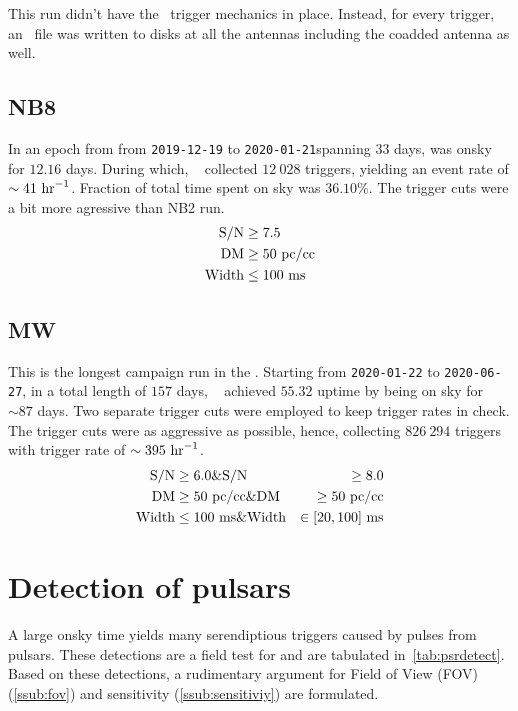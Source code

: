 \par This run didn't have the \dbson~trigger mechanics in place. Instead, for every trigger, an \fbson~file was written to disks at all the antennas including the coadded antenna as well.

\subsection {NB8}

\par In an epoch from from \texttt{2019-12-19} to \texttt{2020-01-21}spanning $33$ days, \vf was onsky for $12.16$ days.
During which, \vf~ collected $12\ 028$ triggers, yielding an event rate of $\sim 41\ {\rm hr}^{-1}$.
Fraction of total time spent on sky was $36.10\%$. 
The trigger cuts were a bit more agressive than NB2 run.
\begin{align*}
	{\rm S/N} &\geq 7.5 \\
	{\rm DM} &\geq 50 {\rm\ pc/cc} \\
	{\rm Width} &\leq 100 {\rm\ ms}
\end{align*}


\subsection {MW}

\par This is the longest campaign run in the \vfps. 
Starting from \texttt{2020-01-22} to \texttt{2020-06-27}, in a total length of $157$ days, \vf~ achieved $55.32$ uptime by being on sky for $\sim 87$ days.
Two separate trigger cuts were employed to keep trigger rates in check.
The trigger cuts were as aggressive as possible, hence, collecting $826\ 294$ triggers with trigger rate of $\sim 395\ {\rm hr}^{-1}$.
\begin{align*}
	{\rm S/N} &\geq 6.0 \&  {\rm S/N} &\geq 8.0 \\
	{\rm DM} &\geq 50 {\rm\ pc/cc}  \& {\rm DM} &\geq 50 {\rm\ pc/cc}\\
	{\rm Width} &\leq 100 {\rm\ ms} \& {\rm Width} &\in [20, 100] {\rm\ ms}
\end{align*}

\section {Detection of pulsars}

\par A large onsky time yields many serendiptious triggers caused by pulses from pulsars. 
These detections are a field test for \vf and are tabulated in~\autoref{tab:psrdetect}.
Based on these detections, a rudimentary argument for Field of View (FOV) (\autoref{ssub:fov}) and sensitivity (\autoref{ssub:sensitiviy}) are formulated.

